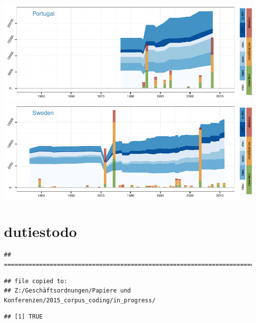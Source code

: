 \documentclass[a4paper]{article}
\begin{document}
\includegraphics{in_progress_files/figure-latex/unnamed-chunk-5-15.pdf}
\includegraphics{in_progress_files/figure-latex/unnamed-chunk-5-16.pdf}

\pagebreak{}

\section{dutiestodo}\label{dutiestodo}

\begin{verbatim}
## ==========================================================================
\end{verbatim}

\begin{verbatim}
## file copied to: 
## Z:/Geschäftsordnungen/Papiere und Konferenzen/2015_corpus_coding/in_progress/
\end{verbatim}

\begin{verbatim}
## [1] TRUE
\end{verbatim}
\end{document}
